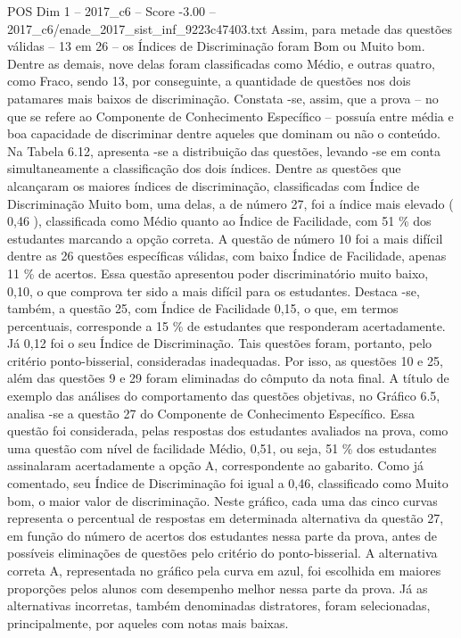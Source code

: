 \begin{textsample}{POS Dim 1 – 2017\_c6 – Score -3.00 – 2017\_c6/enade\_2017\_sist\_inf\_9223c47403.txt}
Assim, para metade das questões válidas – 13 em 26 – os Índices de Discriminação foram Bom ou Muito bom.
Dentre as demais, nove delas foram classificadas como Médio, e outras quatro, como Fraco, sendo 13, por conseguinte, a quantidade de questões nos dois patamares mais baixos de discriminação.
Constata -se, assim, que a prova – no que se refere ao Componente de Conhecimento Específico – possuía entre média e boa capacidade de discriminar dentre aqueles que dominam ou não o conteúdo.
Na Tabela 6.12, apresenta -se a distribuição das questões, levando -se em conta simultaneamente a classificação dos dois índices.
Dentre as questões que alcançaram os maiores índices de discriminação, classificadas com Índice de Discriminação Muito bom, uma delas, a de número 27, foi a índice mais elevado ( 0,46 ), classificada como Médio quanto ao Índice de Facilidade, com 51 \% dos estudantes marcando a opção correta.
A questão de número 10 foi a mais difícil dentre as 26 questões específicas válidas, com baixo Índice de Facilidade, apenas 11 \% de acertos.
Essa questão apresentou poder discriminatório muito baixo, 0,10, o que comprova ter sido a mais difícil para os estudantes.
Destaca -se, também, a questão 25, com Índice de Facilidade 0,15, o que, em termos percentuais, corresponde a 15 \% de estudantes que responderam acertadamente.
Já 0,12 foi o seu Índice de Discriminação.
Tais questões foram, portanto, pelo critério ponto-bisserial, consideradas inadequadas.
Por isso, as questões 10 e 25, além das questões 9 e 29 foram eliminadas do cômputo da nota final.
A título de exemplo das análises do comportamento das questões objetivas, no Gráfico 6.5, analisa -se a questão 27 do Componente de Conhecimento Específico.
Essa questão foi considerada, pelas respostas dos estudantes avaliados na prova, como uma questão com nível de facilidade Médio, 0,51, ou seja, 51 \% dos estudantes assinalaram acertadamente a opção A, correspondente ao gabarito.
Como já comentado, seu Índice de Discriminação foi igual a 0,46, classificado como Muito bom, o maior valor de discriminação.
Neste gráfico, cada uma das cinco curvas representa o percentual de respostas em determinada alternativa da questão 27, em função do número de acertos dos estudantes nessa parte da prova, antes de possíveis eliminações de questões pelo critério do ponto-bisserial.
A alternativa correta A, representada no gráfico pela curva em azul, foi escolhida em maiores proporções pelos alunos com desempenho melhor nessa parte da prova.
Já as alternativas incorretas, também denominadas distratores, foram selecionadas, principalmente, por aqueles com notas mais baixas.

\end{textsample}
